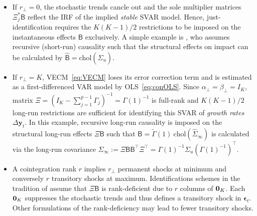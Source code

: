 \begin{itemize}
	\item If $ r_\perp = 0 $, the stochastic trends cancle out and the sole multiplier matrices $ \Xi_j^* \mathsf{B} $ reflect the IRF of the implied \textit{stable} SVAR model. Hence, just-identification requires the $ K(K-1)/2 $ restrictions to be imposed on the instantaneous effects $\mathsf{B} $ exclusively. A simple example is \cite{Sims1980}, who assumes recursive (short-run) causality such that the structural effects on impact can be calculated by $ \widehat{\textsf{B}} = \text{chol} \left( \widehat{\Sigma}_{u} \right) $.
	
	\item If $ r_\perp = K $, VECM~\eqref{eq:VECM} loses its error correction term and is estimated as a first-differenced VAR model by OLS~\eqref{eq:conOLS}. Since $ \alpha_\perp = \beta_\perp = I_K $, matrix $ \Xi = \left(I_K - \sum_{j=1}^{p-1} \Gamma_{j} \right)^{-1} = \Gamma(1)^{-1} $ is full-rank and $ K(K-1)/2 $ long-run restrictions are sufficient for identifying this SVAR of \textit{growth rates} $ \Delta \boldsymbol{y}_{t} $. In this example, recursive long-run causality is imposed on the structural long-run effects $ \Xi \mathsf{B} $ such that $ \widehat{\textsf{B}} = \widetilde{\Gamma}(1) \ \text{chol}\left( \widehat{\Sigma}_{\infty} \right) $ is calculated via the long-run covariance $ \Sigma_\infty := \Xi \mathsf{B} \mathsf{B}^\top\Xi^\top = \Gamma(1)^{-1} \Sigma_u \left( \Gamma(1)^{-1} \right)^\top$. 
	
	\item A cointegration rank $ r $ implies $ r_\perp $ permanent shocks at minimum and conversely $ r $ transitory shocks at maximum. Identifications schemes in the tradition of \citet{KingEtAl1991} assume that $ \Xi \mathsf{B} $ is rank-deficient due to $ r $ columns of $ {\bf 0}_K $. Each $ {\bf 0}_K $ suppresses the stochastic trends and thus defines a transitory shock in $ \boldsymbol{\epsilon}_{t} $. Other formulations of the rank-deficiency may lead to fewer transitory shocks.
\end{itemize} 


